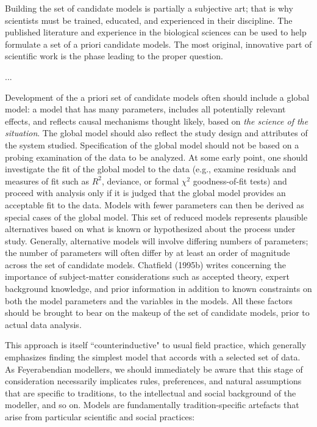 \begin{longquote}
Building the set of candidate models is partially a subjective art; that is why scientists must be trained, educated, and experienced
in their discipline. The published literature and experience in the biological
sciences can be used to help formulate a set of a priori candidate models. The
most original, innovative part of scientific work is the phase leading to the
proper question.

...

Development of the a priori set of candidate models often should include
a global model: a model that has many parameters, includes all potentially
relevant effects, and reflects causal mechanisms thought likely, based on \textit{the
science of the situation}. The global model should also reflect the study design and attributes of the system studied. Specification of the global model
should not be based on a probing examination of the data to be analyzed. At
some early point, one should investigate the fit of the global model to the data
(e.g., examine residuals and measures of fit such as $R^2$, deviance, or formal
$\chi^2$ goodness-of-fit tests) and proceed with analysis only if it is judged that
the global model provides an acceptable fit to the data. Models with fewer
parameters can then be derived as special cases of the global model. This set
of reduced models represents plausible alternatives based on what is known or
hypothesized about the process under study. Generally, alternative models will
involve differing numbers of parameters; the number of parameters will often
differ by at least an order of magnitude across the set of candidate models.
Chatfield (1995b) writes concerning the importance of subject-matter considerations such as accepted theory, expert background knowledge, and prior
information in addition to known constraints on both the model parameters
and the variables in the models. All these factors should be brought to bear on
the makeup of the set of candidate models, prior to actual data analysis.

\cite[p.16-17]{Burnham2002}

\end{longquote}

This approach is itself ``counterinductive" to usual field practice, which generally emphasizes finding the simplest model that accords with a selected set of data. As Feyerabendian modellers, we should immediately be aware that this stage of consideration necessarily implicates rules, preferences, and natural assumptions that are specific to traditions, to the intellectual and social background of the modeller, and so on. Models are fundamentally tradition-specific artefacts that arise from particular scientific and social practices:

